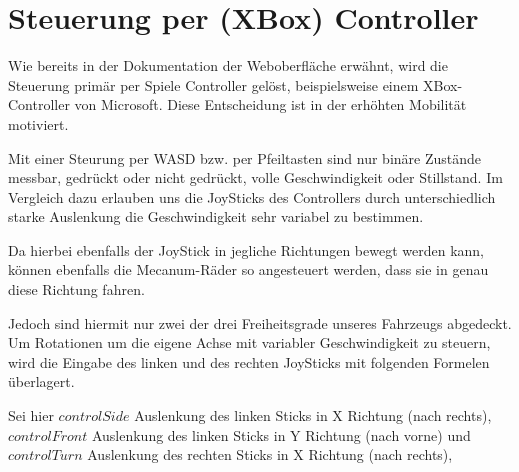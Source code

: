 \begin{table}[ht]
	\centering
\caption{Binäres Protokoll} 
\label{table:protokoll}
\end{table} 



\section{Steuerung per (XBox) Controller}
Wie bereits in der Dokumentation der Weboberfläche erwähnt, wird die Steuerung primär per Spiele Controller gelöst, beispielsweise einem XBox-Controller von Microsoft.
Diese Entscheidung ist in der erhöhten Mobilität motiviert. 

Mit einer Steurung per WASD bzw. per Pfeiltasten sind nur binäre Zustände messbar, gedrückt oder nicht gedrückt, volle Geschwindigkeit oder Stillstand.
Im Vergleich dazu erlauben uns die JoySticks des Controllers durch unterschiedlich starke Auslenkung die Geschwindigkeit sehr variabel zu bestimmen.

Da hierbei ebenfalls der JoyStick in jegliche Richtungen bewegt werden kann, können ebenfalls die Mecanum-Räder so angesteuert werden, dass sie in genau diese Richtung fahren.

Jedoch sind hiermit nur zwei der drei Freiheitsgrade unseres Fahrzeugs abgedeckt. Um Rotationen um die eigene Achse mit variabler Geschwindigkeit zu steuern, wird die Eingabe des linken und des rechten JoySticks mit folgenden Formelen überlagert.

\bigskip
Sei hier $controlSide$ Auslenkung des linken Sticks in X Richtung (nach rechts), 
$controlFront$ Auslenkung des linken Sticks in Y Richtung (nach vorne) und 
$controlTurn$ Auslenkung des rechten Sticks in X Richtung (nach rechts), 

